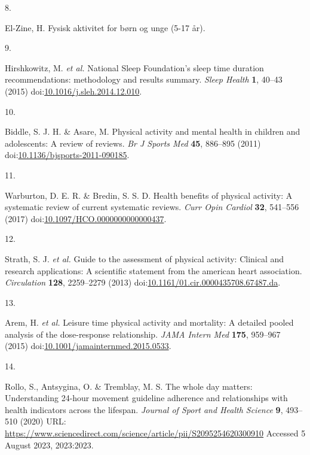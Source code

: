 \documentclass[
  10pt,
]{scrbook}
\newlength{\cslhangindent}
\newlength{\csllabelwidth}
\newlength{\cslentryspacingunit} %
\newenvironment{CSLReferences}[2] %
 {%
  \setlength{\parindent}{0pt}
  \ifodd #1
  \let\oldpar\par
  \def\par{\hangindent=\cslhangindent\oldpar}
  \fi
  \setlength{\parskip}{#2\cslentryspacingunit}
 }%
 {}
\newcommand{\CSLLeftMargin}[1]{\parbox[t]{\csllabelwidth}{#1}}
\newcommand{\CSLRightInline}[1]{\parbox[t]{\linewidth - \csllabelwidth}{#1}\break}
\let\originaltextbf\textbf
\renewcommand{\textbf}[1]{\textcolor{color1}{\textsf{\originaltextbf{#1}}}}
\begin{document}
\begin{CSLReferences}{0}{0}
\leavevmode{}%
\CSLLeftMargin{8. }%
\CSLRightInline{El-Zine, H. Fysisk aktivitet for børn og unge (5-17
år).}

\leavevmode{}%
\CSLLeftMargin{9. }%
\CSLRightInline{Hirshkowitz, M. \emph{et al.} National Sleep
Foundation's sleep time duration recommendations: methodology and
results summary. \emph{Sleep Health} \textbf{1}, 40--43 (2015)
doi:\href{https://doi.org/10.1016/j.sleh.2014.12.010}{10.1016/j.sleh.2014.12.010}.}

\leavevmode{}%
\CSLLeftMargin{10. }%
\CSLRightInline{Biddle, S. J. H. \& Asare, M. Physical activity and
mental health in children and adolescents: A review of reviews. \emph{Br
J Sports Med} \textbf{45}, 886--895 (2011)
doi:\href{https://doi.org/10.1136/bjsports-2011-090185}{10.1136/bjsports-2011-090185}.}

\leavevmode{}%
\CSLLeftMargin{11. }%
\CSLRightInline{Warburton, D. E. R. \& Bredin, S. S. D. Health benefits
of physical activity: A systematic review of current systematic reviews.
\emph{Curr Opin Cardiol} \textbf{32}, 541--556 (2017)
doi:\href{https://doi.org/10.1097/HCO.0000000000000437}{10.1097/HCO.0000000000000437}.}

\leavevmode{}%
\CSLLeftMargin{12. }%
\CSLRightInline{Strath, S. J. \emph{et al.} Guide to the assessment of
physical activity: Clinical and research applications: A scientific
statement from the american heart association. \emph{Circulation}
\textbf{128}, 2259--2279 (2013)
doi:\href{https://doi.org/10.1161/01.cir.0000435708.67487.da}{10.1161/01.cir.0000435708.67487.da}.}

\leavevmode{}%
\CSLLeftMargin{13. }%
\CSLRightInline{Arem, H. \emph{et al.} Leisure time physical activity
and mortality: A detailed pooled analysis of the dose-response
relationship. \emph{{JAMA} Intern Med} \textbf{175}, 959--967 (2015)
doi:\href{https://doi.org/10.1001/jamainternmed.2015.0533}{10.1001/jamainternmed.2015.0533}.}

\leavevmode{}%
\CSLLeftMargin{14. }%
\CSLRightInline{Rollo, S., Antsygina, O. \& Tremblay, M. S. The whole
day matters: Understanding 24-hour movement guideline adherence and
relationships with health indicators across the lifespan. \emph{Journal
of Sport and Health Science} \textbf{9}, 493--510 (2020) URL:
\url{https://www.sciencedirect.com/science/article/pii/S2095254620300910}
Accessed 5 August 2023, 2023:2023.}


\end{CSLReferences}
\end{document}

